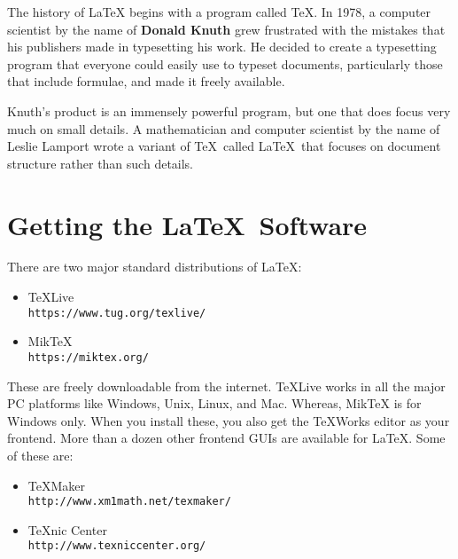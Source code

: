 \documentclass[fleqn, 10pt, twoside, blindreview]{IOEGC}
\begin{document}
The history of LaTeX begins with a program called \TeX. In 1978, a computer 
scientist by the name of \textbf{Donald Knuth} grew frustrated with the mistakes
that his publishers made in typesetting his work. He decided to create a 
typesetting program that everyone could easily use to typeset documents, 
particularly those that include formulae, and made it freely available. 

Knuth's product is an immensely powerful program, but one that does focus
very much on small details. A mathematician and computer scientist by the
name of Leslie Lamport wrote a variant of \TeX\ called \LaTeX\ that focuses on
document structure rather than such details.


\section{Getting the \LaTeX\ Software }\label{sec:getting}
There are two major standard distributions of \LaTeX:
\begin{itemize}[noitemsep]
	\item TeXLive \\ \texttt{\small{https://www.tug.org/texlive/}}
	\item MikTeX \\ \texttt{\small{https://miktex.org/}}
\end{itemize}

These are freely downloadable from the internet. TeXLive works in all the major 
PC platforms like Windows, Unix, Linux, and Mac. Whereas, MikTeX is for Windows 
only. When you install these, you also get the TeXWorks editor as your frontend.
More than a dozen other frontend GUIs are available for \LaTeX. 
Some of these are:

\begin{itemize}[noitemsep]
	\item TeXMaker \\ \texttt{\small{http://www.xm1math.net/texmaker/}}
	\item TeXnic Center\\ \texttt{\small{http://www.texniccenter.org/}}
\end{itemize}
\end{document}
